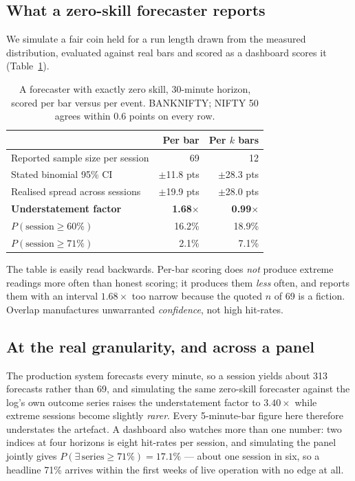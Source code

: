 \documentclass[runningheads]{llncs}
\begin{document}
\subsection{What a zero-skill forecaster reports}

We simulate a fair coin held for a run length drawn from the measured
distribution, evaluated against real bars and scored as a dashboard scores it
(Table~\ref{tab:zero}).

\begin{table}[htbp]
\caption{A forecaster with exactly zero skill, 30-minute horizon, scored per bar
versus per event. BANKNIFTY; NIFTY 50 agrees within 0.6 points on every row.}
\label{tab:zero}
\centering
\footnotesize
\begin{tabular}{@{}lrr@{}}
\toprule
 & \textbf{Per bar} & \textbf{Per $k$ bars} \\
\midrule
Reported sample size per session & 69 & 12 \\
Stated binomial 95\% CI & $\pm$11.8 pts & $\pm$28.3 pts \\
Realised spread across sessions & $\pm$19.9 pts & $\pm$28.0 pts \\
\textbf{Understatement factor} & \textbf{1.68$\times$} & \textbf{0.99$\times$} \\
\midrule
$P(\text{session} \geq 60\%)$ & 16.2\% & 18.9\% \\
$P(\text{session} \geq 71\%)$ & 2.1\% & 7.1\% \\
\bottomrule
\end{tabular}
\end{table}

The table is easily read backwards. Per-bar scoring does \emph{not} produce
extreme readings more often than honest scoring; it produces them \emph{less}
often, and reports them with an interval $1.68\times$ too narrow because the
quoted $n$ of 69 is a fiction. Overlap manufactures unwarranted
\emph{confidence}, not high hit-rates.

\subsection{At the real granularity, and across a panel}

The production system forecasts every minute, so a session yields about 313
forecasts rather than 69, and simulating the same zero-skill forecaster against
the log's own outcome series raises the understatement factor to $3.40\times$
while extreme sessions become slightly \emph{rarer}. Every 5-minute-bar figure
here therefore understates the artefact. A dashboard also watches more than one
number: two indices at four horizons is eight hit-rates per session, and
simulating the panel jointly gives $P(\exists\,\text{series}\geq 71\%) = 17.1\%$
--- about one session in six, so a headline 71\% arrives within the first weeks
of live operation with no edge at all.
\end{document}
